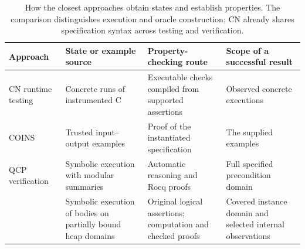 \begin{table}[t]
\centering\small
\caption{How the closest approaches obtain states and establish properties. The comparison distinguishes execution and oracle construction; CN already shares specification syntax across testing and verification.}
\label{tab:positioning}
\begin{tabular}{@{}p{}p{}p{}p{}@{}}
\toprule
Approach & State or example source & Property-checking route & Scope of a successful result\\
\midrule
CN runtime testing~\cite{banerjee2025fulminate,aamer2026workflow} & Concrete runs of instrumented C & Executable checks compiled from supported assertions & Observed concrete executions\\
COINS~\cite{yang2026coins} & Trusted input--output examples & Proof of the instantiated specification & The supplied examples\\
QCP verification~\cite{wu2026qcp} & Symbolic execution with modular summaries & Automatic reasoning and Rocq proofs & Full specified precondition domain\\
\tespec{} & Symbolic execution of bodies on partially bound heap domains & Original logical assertions; computation and checked proofs & Covered instance domain and selected internal observations\\
\bottomrule
\end{tabular}
\end{table}
